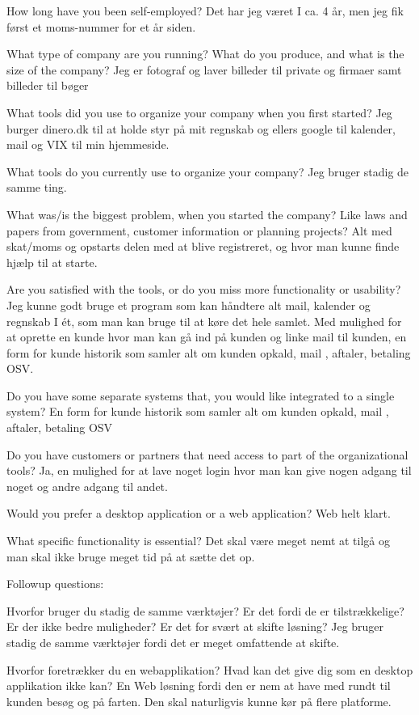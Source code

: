 How long have you been self-employed?
Det har jeg været I ca. 4 år, men jeg fik først et moms-nummer for et år siden.
  
What type of company are you running? What do you produce, and what is the size of the company?
Jeg er fotograf og laver billeder til private og firmaer samt billeder til bøger

What tools did you use to organize your company when you first started?
Jeg burger dinero.dk til at holde styr på mit regnskab og ellers google til kalender, mail og VIX til min hjemmeside.  

What tools do you currently use to organize your company?
Jeg bruger stadig de samme ting.

What was/is the biggest problem, when you started the company? Like laws and papers from government, customer information or planning projects?
Alt med skat/moms og opstarts delen med at blive registreret, og hvor man kunne finde hjælp til at starte.

Are you satisfied with the tools, or do you miss more functionality or usability?
Jeg kunne godt bruge et program som kan håndtere alt mail, kalender og regnskab I ét, som man kan bruge til at køre det hele samlet. Med mulighed for at oprette en kunde hvor man kan gå ind på kunden og linke mail til kunden, en form for kunde historik som samler alt om kunden opkald, mail , aftaler, betaling OSV.

Do you have some separate systems that, you would like integrated to a single system?
En form for kunde historik som samler alt om kunden opkald, mail , aftaler, betaling OSV

Do you have customers or partners that need access to part of the organizational tools?
Ja, en mulighed for at lave noget login hvor man kan give nogen adgang til noget og andre adgang til andet.

Would you prefer a desktop application or a web application?
Web helt klart.

What specific functionality is essential?
Det skal være meget nemt at tilgå og man skal ikke bruge meget tid på at sætte det op.

Followup questions:

Hvorfor bruger du stadig de samme værktøjer? Er det fordi de er tilstrækkelige? Er der ikke bedre muligheder? Er det for svært at skifte løsning?
Jeg bruger stadig de samme værktøjer fordi det er meget omfattende at skifte. 


Hvorfor foretrækker du en webapplikation? Hvad kan det give dig som en desktop applikation ikke kan? 
En Web løsning fordi den er nem at have med rundt til kunden besøg og på farten. Den skal naturligvis kunne kør på flere platforme.


